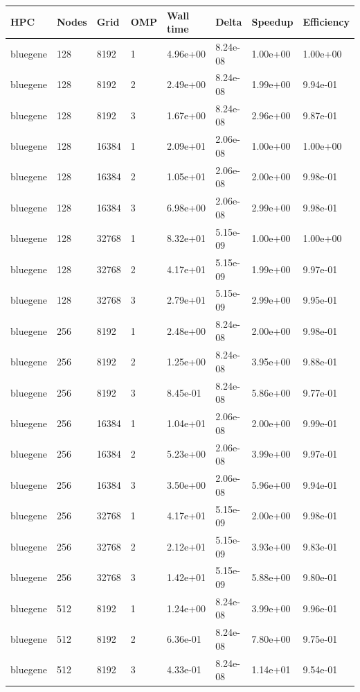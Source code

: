 \documentclass[12pt,a4paper]{scrartcl}
\begin{document}
\begin{center}
\begin{table}[h]
\begin{tabular}{l|lllllll}
\label{tabular:bluegene}
HPC & Nodes & Grid & OMP & Wall time & Delta & Speedup & Efficiency \\
\hline
bluegene & 128 & 8192 & 1 & 4.96e+00 & 8.24e-08 & 1.00e+00 & 1.00e+00 \\
bluegene & 128 & 8192 & 2 & 2.49e+00 & 8.24e-08 & 1.99e+00 & 9.94e-01 \\
bluegene & 128 & 8192 & 3 & 1.67e+00 & 8.24e-08 & 2.96e+00 & 9.87e-01 \\
bluegene & 128 & 16384 & 1 & 2.09e+01 & 2.06e-08 & 1.00e+00 & 1.00e+00 \\
bluegene & 128 & 16384 & 2 & 1.05e+01 & 2.06e-08 & 2.00e+00 & 9.98e-01 \\
bluegene & 128 & 16384 & 3 & 6.98e+00 & 2.06e-08 & 2.99e+00 & 9.98e-01 \\
bluegene & 128 & 32768 & 1 & 8.32e+01 & 5.15e-09 & 1.00e+00 & 1.00e+00 \\
bluegene & 128 & 32768 & 2 & 4.17e+01 & 5.15e-09 & 1.99e+00 & 9.97e-01 \\
bluegene & 128 & 32768 & 3 & 2.79e+01 & 5.15e-09 & 2.99e+00 & 9.95e-01 \\
bluegene & 256 & 8192 & 1 & 2.48e+00 & 8.24e-08 & 2.00e+00 & 9.98e-01 \\
bluegene & 256 & 8192 & 2 & 1.25e+00 & 8.24e-08 & 3.95e+00 & 9.88e-01 \\
bluegene & 256 & 8192 & 3 & 8.45e-01 & 8.24e-08 & 5.86e+00 & 9.77e-01 \\
bluegene & 256 & 16384 & 1 & 1.04e+01 & 2.06e-08 & 2.00e+00 & 9.99e-01 \\
bluegene & 256 & 16384 & 2 & 5.23e+00 & 2.06e-08 & 3.99e+00 & 9.97e-01 \\
bluegene & 256 & 16384 & 3 & 3.50e+00 & 2.06e-08 & 5.96e+00 & 9.94e-01 \\
bluegene & 256 & 32768 & 1 & 4.17e+01 & 5.15e-09 & 2.00e+00 & 9.98e-01 \\
bluegene & 256 & 32768 & 2 & 2.12e+01 & 5.15e-09 & 3.93e+00 & 9.83e-01 \\
bluegene & 256 & 32768 & 3 & 1.42e+01 & 5.15e-09 & 5.88e+00 & 9.80e-01 \\
bluegene & 512 & 8192 & 1 & 1.24e+00 & 8.24e-08 & 3.99e+00 & 9.96e-01 \\
bluegene & 512 & 8192 & 2 & 6.36e-01 & 8.24e-08 & 7.80e+00 & 9.75e-01 \\
bluegene & 512 & 8192 & 3 & 4.33e-01 & 8.24e-08 & 1.14e+01 & 9.54e-01 \\

\end{tabular}
\end{table}
\end{center}
\end{document}
